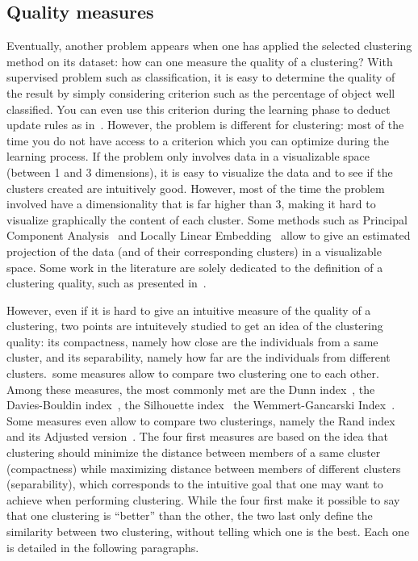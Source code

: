     \subsection{Quality measures}
\label{sec:quality_measures}
    Eventually, another problem appears when one has applied the selected clustering method on its dataset: how can one measure the quality of a clustering? With supervised problem such as classification, it is easy to determine the quality of the result by simply considering criterion such as the percentage of object well classified. You can even use this criterion during the learning phase to deduct update rules as in~\cite{vincent2010stacked}. However, the problem is different for clustering: most of the time you do not have access to a criterion which you can optimize during the learning process. If the problem only involves data in a visualizable space (between 1 and 3 dimensions), it is easy to visualize the data and to see if the clusters created are intuitively good. However, most of the time the problem involved have a dimensionality that is far higher than 3, making it hard to visualize graphically the content of each cluster. Some methods such as Principal Component Analysis~\cite{wold1987principal} and Locally Linear Embedding~\cite{roweis2000nonlinear} allow to give an estimated projection of the data (and of their corresponding clusters) in a visualizable space. Some work in the literature are solely dedicated to the definition of a clustering quality, such as presented in~\cite{ben2009measures}.

    However, even if it is hard to give an intuitive measure of the quality of a clustering, two points are intuitevely studied to get an idea of the clustering quality: its compactness, namely how close are the individuals from a same cluster, and its separability, namely how far are the individuals from different clusters.\ some measures allow to compare two clustering one to each other. Among these measures, the most commonly met are the Dunn index~\cite{dunn1973fuzzy}, the Davies-Bouldin index~\cite{davies1979cluster}, the Silhouette index~\cite{rousseeuw1987silhouettes} the Wemmert-Gancarski Index~\cite{wemmert2000classification}. Some measures even allow to compare two clusterings, namely the Rand index~\cite{rand1971objective} and its Adjusted version~\cite{hubert1985comparing}. The four first measures are based on the idea that clustering should minimize the distance between members of a same cluster (compactness) while maximizing distance between members of different clusters (separability), which corresponds to the intuitive goal that one may want to achieve when performing clustering.  While the four first make it possible to say that one clustering is ``better'' than the other, the two last only define the similarity between two clustering, without telling which one is the best. Each one is detailed in the following paragraphs.

